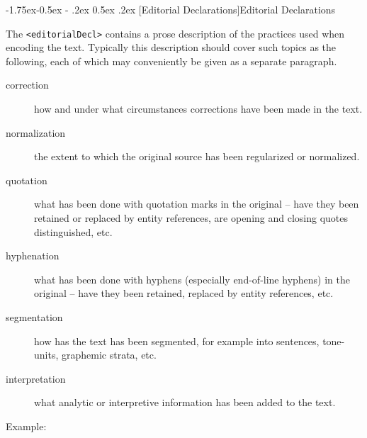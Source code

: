 \documentclass[11pt,twoside]{article}\makeatletter
\makeatletter
\renewcommand\subsection{\@startsection{subsection}{2}{\z@}%
     {-1.75ex\@plus -0.5ex \@minus- .2ex}%
     {0.5ex \@plus .2ex}%
     {\reset@font\Large\sffamily}}
\renewcommand\subsubsection{\@startsection{subsubsection}{3}{\z@}%
     {-1.5ex\@plus -0.35ex \@minus -.2ex}%
     {0.5ex \@plus .2ex}%
     {\reset@font\large\sffamily}}
\def\DivIII{\subsubsection}
\def\DivIII{\subsection}
\makeatother
\begin{document}
\DivIII[Editorial Declarations]{Editorial Declarations}\par The \texttt{<editorialDecl>} contains a prose description of the
practices used when encoding the text. Typically this description
should cover such topics as the following, each of which may
conveniently be given as a separate paragraph. 
\begin{description}

\item[correction ]how and under what circumstances corrections have been made in
the text.
\item[normalization]the extent to which the original source has been regularized or
normalized.
\item[quotation]what has been done with quotation marks in the original -- have
they been retained or replaced by entity references, are opening and
closing quotes distinguished, etc. 
\item[hyphenation]what has been done with hyphens (especially end-of-line
hyphens)  in the original -- have they been retained, replaced by
entity references, etc.
\item[segmentation]how has the text has been segmented, for example into
sentences, tone-units, graphemic strata, etc.
\item[interpretation]what analytic or interpretive information has been added to the
text. 
\end{description} \par Example:
\end{document}
